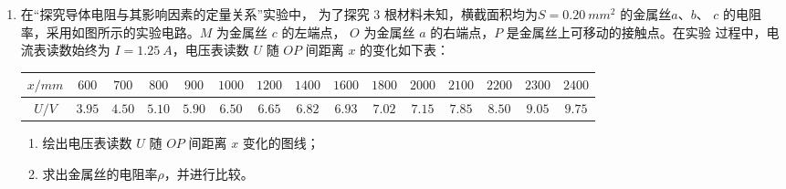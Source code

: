 

\begin{enumerate}
\item
{}
在“探究导体电阻与其影响因素的定量关系”实验中，
为了探究 $ 3 $ 根材料未知，横截面积均为$ S=0.20 \ mm^{2} $ 的金属丝$ a $、$ b $、
$ c $ 的电阻率，采用如图所示的实验电路。$ M $ 为金属丝 $ c $ 的左端点，
$ O $ 为金属丝 $ a $ 的右端点，$ P $ 是金属丝上可移动的接触点。在实验
过程中，电流表读数始终为 $ I=1.25 \ A $，电压表读数 $ U $ 随 $ OP $ 间距离 $ x $ 的变化如下表：
\begin{table}[h!]
\centering 
\begin{tabular}{|c|c|c|c|c|c|c|c|c|c|c|c|c|c|c|}
\hline 
$ x/mm $ & $ 600 $ & $ 700 $ & $ 800 $ & $ 900 $ & $ 1000 $ & $ 1200 $ & $ 1400 $ & $ 1600 $ & $ 1800 $ & $ 2000 $ & $ 2100 $ & $ 2200 $ & $ 2300 $ & $ 2400 $
\\
\hline
$ U/V $ & $ 3.95 $ & $ 4.50 $ & $ 5.10 $ & $ 5.90 $ & $ 6.50 $ & $ 6.65 $ & $ 6.82 $ & $ 6.93 $ & $ 7.02 $ & $ 7.15 $ & $ 7.85 $ & $ 8.50 $ & $ 9.05 $ & $ 9.75 $\\ 
\hline 
\end{tabular}
\end{table} 
\begin{figure}[h!]
\centering

\end{figure}

\begin{enumerate}
\item
绘出电压表读数 $ U $ 随 $ OP $ 间距离 $ x $ 变化的图线；
\item 
求出金属丝的电阻率$ \rho $，并进行比较。



\end{enumerate}


\end{enumerate}
